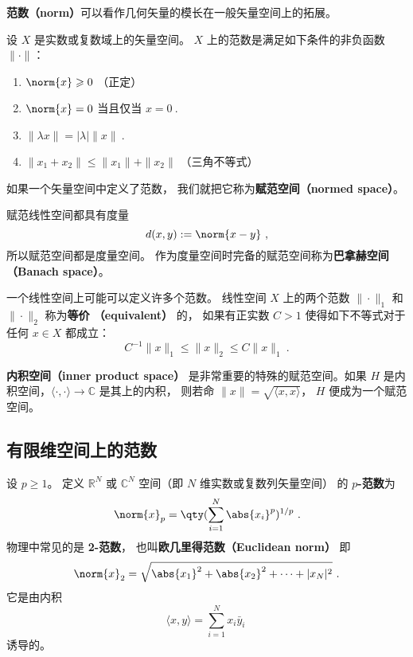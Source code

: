 
\begin{issues}
\end{issues}



\textbf{范数（norm）}可以看作几何矢量的模长在一般矢量空间上的拓展。
\begin{definition}{}\label{def_NormV_1}
设 $X$ 是实数或复数域上的矢量空间。 $X$ 上的范数是满足如下条件的非负函数 $\|\cdot\|$：
\begin{enumerate}
\item $\norm{x} \geqslant 0$ （正定）
\item $\norm{x} = 0$ 当且仅当 $x = 0~.$
\item $\|\lambda x\| = |\lambda|\|x\|~.$
\item $\|x_1+x_2\| \leqslant \|x_1\|+ \|x_2\|$ （三角不等式）
\end{enumerate}
如果一个矢量空间中定义了范数， 我们就把它称为\textbf{赋范空间（normed space）}。
\end{definition}

赋范线性空间都具有度量
\begin{equation}
d(x,y) := \norm{x-y}~,
\end{equation}
所以赋范空间都是度量空间。 作为度量空间时完备的赋范空间称为\textbf{巴拿赫空间（Banach space）}。

一个线性空间上可能可以定义许多个范数。 线性空间 $X$ 上的两个范数 $\|\cdot\|_1$ 和 $\|\cdot\|_2$ 称为\textbf{等价 （equivalent）} 的， 如果有正实数 $C>1$ 使得如下不等式对于任何 $x\in X$ 都成立：
$$
C^{-1}\|x\|_{1}\leq\|x\|_2\leq C\|x\|_1~.
$$

\textbf{内积空间（inner product space）} 是非常重要的特殊的赋范空间。如果 $H$ 是内积空间，$\langle\cdot,\cdot\rangle\to\mathbb C$ 是其上的内积， 则若命 $\|x\|=\sqrt{\langle x,x\rangle }$， $H$ 便成为一个赋范空间。

\subsection{有限维空间上的范数}
设 $p\geq1$。 定义 $\mathbb R^N$ 或 $\mathbb C^N$ 空间（即 $N$ 维实数或复数列矢量空间） 的 \textbf{$p$-范数}为
\begin{equation}
\norm{ x}_p = \qty(\sum_{i=1}^N \abs{x_i}^p)^{1/p}~.
\end{equation}
物理中常见的是 \textbf{2-范数}， 也叫\textbf{欧几里得范数（Euclidean norm）} 即
\begin{equation}
\norm{ x}_2 = \sqrt{\abs{x_1}^2 + \abs{x_2}^2 + \dots+|x_N|^2}~.
\end{equation}
它是由内积
$$
\langle x,y\rangle=\sum_{i=1}^Nx_i\bar y_i~
$$
诱导的。

